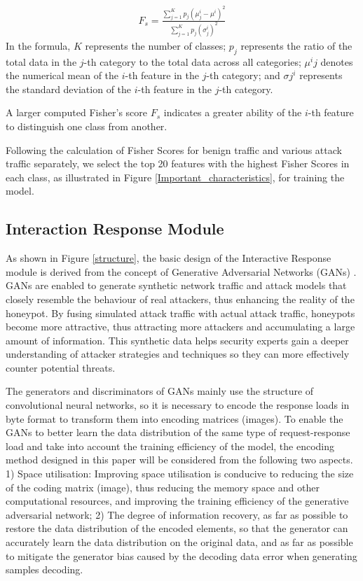 \documentclass[journal]{IEEEtai}
\begin{document}
\begin{align}
		F_{s}=\frac{\sum_{j=1}^{K} p_{j}\left(\mu_{j}^{i}-\mu^{i}\right)^{2}}{\sum_{j=1}^{K} p_{j}\left(\sigma_{j}^{i}\right)^{2}}
		\label{FisherScore}
	\end{align}
In the formula, $K$ represents the number of classes; $p_j$ represents the ratio of the total data in the $j$-th category to the total data across all categories; $\mu^{i}{j}$ denotes the numerical mean of the $i$-th feature in the $j$-th category; and $\sigma{j}^{i}$ represents the standard deviation of the $i$-th feature in the $j$-th category.

A larger computed Fisher's score $F_{s}$ indicates a greater ability of the $i$-th feature to distinguish one class from another.



Following the calculation of Fisher Scores for benign traffic and various attack traffic separately, we select the top 20 features with the highest Fisher Scores in each class, as illustrated in Figure \ref{Important_characteristics}, for training the model.







\subsection{Interaction Response Module}
\label{Interaction Response Module}
As shown in Figure \ref{structure}, the basic design of the Interactive Response module is derived from the concept of Generative Adversarial Networks (GANs) \cite{8253599, 9850373}.
GANs are enabled to generate synthetic network traffic and attack models that closely resemble the behaviour of real attackers, thus enhancing the reality of the honeypot.
By fusing simulated attack traffic with actual attack traffic, honeypots become more attractive, thus attracting more attackers and accumulating a large amount of information.
This synthetic data helps security experts gain a deeper understanding of attacker strategies and techniques so they can more effectively counter potential threats.

The generators and discriminators of GANs mainly use the structure of convolutional neural networks, so it is necessary to encode the response loads in byte format to transform them into encoding matrices (images). 
To enable the GANs to better learn the data distribution of the same type of request-response load and take into account the training efficiency of the model, the encoding method designed in this paper will be considered from the following two aspects.
1) Space utilisation: Improving space utilisation is conducive to reducing the size of the coding matrix (image), thus reducing the memory space and other computational resources, and improving the training efficiency of the generative adversarial network; 
2) The degree of information recovery, as far as possible to restore the data distribution of the encoded elements, so that the generator can accurately learn the data distribution on the original data, and as far as possible to mitigate the generator bias caused by the decoding data error when generating samples decoding.
\end{document}
